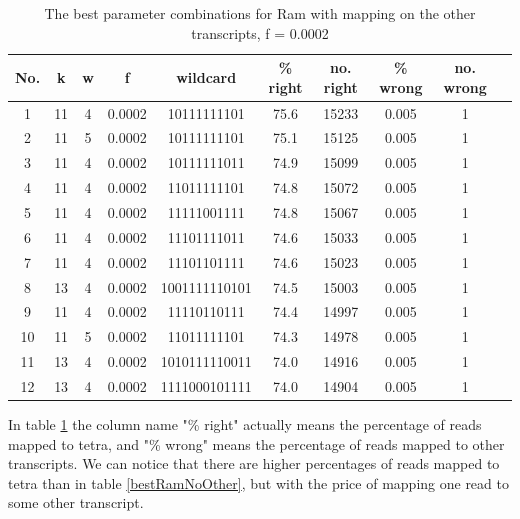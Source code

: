 \documentclass[times, utf8, zavrsni, numeric]{fer}
\begin{document}
\begin{longtable}{cccccccccc}
    \caption {The best parameter combinations for Ram with mapping on the other transcripts, f = 0.0002}
    \label {bestRamWithOther} \\
    \hline \multicolumn{1}{c}{\textbf{No.}} & \multicolumn{1}{c}{\textbf{k}} & \multicolumn{1}{c}{\textbf{w}}  
    & \multicolumn{1}{c}{\textbf{f}} & \multicolumn{1}{c}{\textbf{wildcard}} & \multicolumn{1}{c}{\textbf{\% right}}
    & \multicolumn{1}{c}{\textbf{no. right}}  & \multicolumn{1}{c}{\textbf{\% wrong}} & \multicolumn{1}{c}{\textbf{no. wrong}} \\ \hline
    \endfirsthead
    1 & 11 & 4 & 0.0002 & 10111111101 & 75.6 & 15233 & 0.005 & 1 \\ \hline
    2 & 11 & 5 & 0.0002 & 10111111101 & 75.1 & 15125 & 0.005 & 1 \\ \hline
    3 & 11 & 4 & 0.0002 & 10111111011 & 74.9 & 15099 & 0.005 & 1 \\ \hline
    4 & 11 & 4 & 0.0002 & 11011111101 & 74.8 & 15072 & 0.005 & 1 \\ \hline
    5 & 11 & 4 & 0.0002 & 11111001111 & 74.8 & 15067 & 0.005 & 1 \\ \hline
    6 & 11 & 4 & 0.0002 & 11101111011 & 74.6 & 15033 & 0.005 & 1 \\ \hline
    7 & 11 & 4 & 0.0002 & 11101101111 & 74.6 & 15023 & 0.005 & 1 \\ \hline
    8 & 13 & 4 & 0.0002 & 1001111110101 & 74.5 & 15003 & 0.005 & 1 \\ \hline
    9 & 11 & 4 & 0.0002 & 11110110111 & 74.4 & 14997 & 0.005 & 1 \\ \hline
    10 & 11 & 5 & 0.0002 & 11011111101 & 74.3 & 14978 & 0.005 & 1 \\ \hline
    11 & 13 & 4 & 0.0002 & 1010111110011 & 74.0 & 14916 & 0.005 & 1 \\ \hline
    12 & 13 & 4 & 0.0002 & 1111000101111 & 74.0 & 14904 & 0.005 & 1 \\ \hline
\end{longtable}    

In table \ref{bestRamWithOther} the column name "\% right" actually means the percentage of reads
mapped to tetra, and "\% wrong" means the percentage of reads mapped to other transcripts. 
We can notice that there are higher percentages of reads mapped to tetra than in table 
\ref{bestRamNoOther}, but with the price of mapping one read to some other transcript. \\
\end{document}
